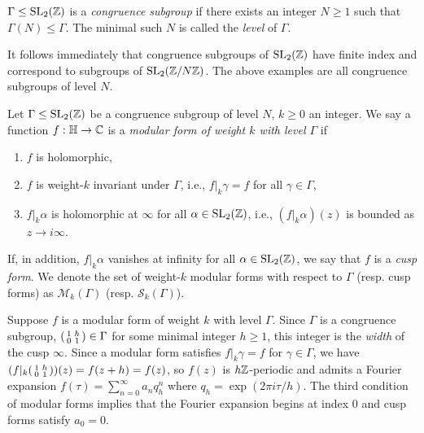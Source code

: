 \begin{defn}
$\Gamma \leq \operatorname{SL}_2(\mathbb{Z})$ is a \textit{congruence subgroup} if there exists an integer $N \geq 1$ such that $\Gamma(N) \leq \Gamma$. The minimal such $N$ is called the \textit{level} of $\Gamma$.

It follows immediately that congruence subgroups of $\operatorname{SL}_2(\mathbb{Z})$ have finite index and correspond to subgroups of $\operatorname{SL}_2(\mathbb{Z}/N\mathbb{Z})$. The above examples are all congruence subgroups of level $N$.
\end{defn}

\begin{defn}
    Let $\Gamma \leq \operatorname{SL}_2(\mathbb{Z})$ be a congruence subgroup of level $N$, $k \geq 0$ an integer. We say a function $f: \mathbb{H} \rightarrow \mathbb{C}$ is a \textit{modular form of weight $k$ with level $\Gamma$} if

    \begin{enumerate}
        \item $f$ is holomorphic,
        \item $f$ is weight-$k$ invariant under $\Gamma$, i.e., $f|_k\gamma = f$ for all $\gamma \in \Gamma$,
        \item $f|_k\alpha $ is holomorphic at $\infty$ for all $\alpha \in \operatorname{SL}_2(\mathbb{Z})$, i.e., $(f|_k \alpha )(z)$ is bounded as $z \rightarrow i\infty$.
    \end{enumerate}

    If, in addition, $f|_k \alpha$ vanishes at infinity for all $\alpha \in \operatorname{SL}_2(\mathbb{Z})$, we say that $f$ is a \textit{cusp form}. We denote the set of weight-$k$ modular forms with respect to $\Gamma$ (resp. cusp forms) as $\mathcal{M}_k(\Gamma)$ (resp. $\mathcal{S}_k(\Gamma)$).
\end{defn}

Suppose $f$ is a modular form of weight $k$ with level $\Gamma$. Since $\Gamma$ is a congruence subgroup, $\begin{psmallmatrix}
    1 & h \\ 0 & 1
\end{psmallmatrix} \in \Gamma$ for some minimal integer $h\geq 1$, this integer is the \textit{width} of the cusp $\infty$. Since a modular form satisfies $f|_k \gamma = f$ for $\gamma \in \Gamma$, we have $(f|_k \begin{psmallmatrix}
    1 & h \\ 0 & 1
\end{psmallmatrix})(z) = f(z+h) = f(z) $, so $f(z)$ is $h\mathbb{Z}$-periodic and admits a Fourier expansion $f(\tau) = \sum_{n=0}^\infty a_n q_{h}^n$ where $q_h = \exp(2\pi i\tau / h)$. The third condition of modular forms implies that the Fourier expansion begins at index $0$ and cusp forms satisfy $a_0 = 0$.

